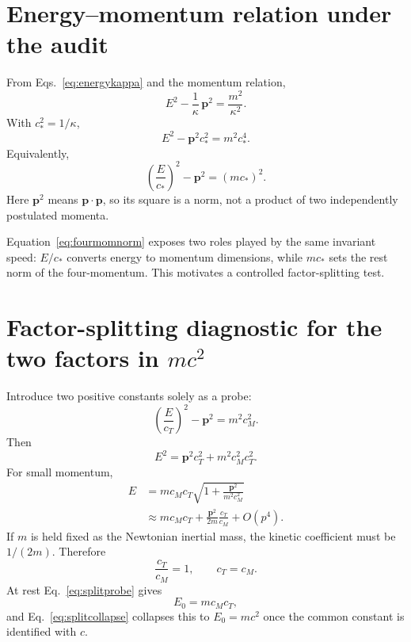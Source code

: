 \documentclass[11pt,a4paper]{article}
\newcommand{\kpar}{\kappa}
\newcommand{\cstar}{c_{\!*}}
\begin{document}
\section{Energy--momentum relation under the audit}
From Eqs.~\eqref{eq:energykappa} and the momentum relation,
\begin{equation}
E^2-\frac{1}{\kpar}\,\bm p^2=\frac{m^2}{\kpar^2}.
\label{eq:epkappa}
\end{equation}
With $\cstar^2=1/\kpar$,
\begin{equation}
E^2-\bm p^2\cstar^2=m^2\cstar^4.
\label{eq:epstandard}
\end{equation}
Equivalently,
\begin{equation}
\left(\frac{E}{\cstar}\right)^2-\bm p^2=(m\cstar)^2.
\label{eq:fourmomnorm}
\end{equation}
Here $\bm p^2$ means $\bm p\!\cdot\bm p$, so its square is a norm, not a product of two independently postulated momenta.

Equation~\eqref{eq:fourmomnorm} exposes two roles played by the same invariant speed: $E/\cstar$ converts energy to momentum dimensions, while $m\cstar$ sets the rest norm of the four-momentum. This motivates a controlled factor-splitting test.

\section{Factor-splitting diagnostic for the two factors in \texorpdfstring{$mc^2$}{mc squared}}
Introduce two positive constants solely as a probe:
\begin{equation}
\left(\frac{E}{c_T}\right)^2-\bm p^2=m^2c_M^2.
\label{eq:splitprobe}
\end{equation}
Then
\begin{equation}
E^2=\bm p^2c_T^2+m^2c_M^2c_T^2.
\end{equation}
For small momentum,
\begin{align}
E
&=mc_Mc_T
\sqrt{1+\frac{\bm p^2}{m^2c_M^2}}\\
&\approx mc_Mc_T
+\frac{\bm p^2}{2m}\frac{c_T}{c_M}+O(p^4).
\label{eq:splitexp}
\end{align}
If $m$ is held fixed as the Newtonian inertial mass, the kinetic coefficient must be $1/(2m)$. Therefore
\begin{equation}
\frac{c_T}{c_M}=1,
\qquad c_T=c_M.
\label{eq:splitcollapse}
\end{equation}
At rest Eq.~\eqref{eq:splitprobe} gives
\begin{equation}
E_0=mc_Mc_T,
\end{equation}
and Eq.~\eqref{eq:splitcollapse} collapses this to $E_0=mc^2$ once the common constant is identified with $c$.
\end{document}
